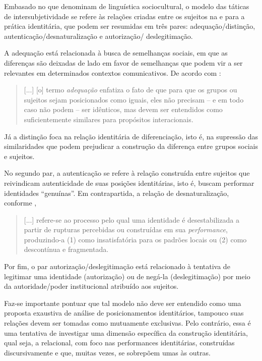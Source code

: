 \documentclass[portuguese]{textolivre}
\begin{document}
Embasado no que \textcite{bucholtz_language_2004,bucholtz_identity_2005} denominam de linguística sociocultural, o modelo das táticas de intersubjetividade se refere às relações criadas entre os sujeitos na e para a prática identitária, que podem ser resumidas em três pares: adequação/distinção, autenticação/desnaturalização e autorização/ deslegitimação.

A adequação está relacionada à busca de semelhanças sociais, em que as diferenças são deixadas de lado em favor de semelhanças que podem vir a ser relevantes em determinados contextos comunicativos. De acordo com \textcite[p. 599, grifo das autoras]{bucholtz_identity_2005}:

\begin{quote}
    [...] [o] termo \textit{adequação} enfatiza o fato de que para que os grupos ou sujeitos sejam posicionados como iguais, eles não precisam – e em todo caso não podem – ser idênticos, mas devem ser entendidos como suficientemente similares para propósitos interacionais.
\end{quote}

Já a distinção foca na relação identitária de diferenciação, isto é, na supressão das similaridades que podem prejudicar a construção da diferença entre grupos sociais e sujeitos.

No segundo par, a autenticação se refere à relação construída entre sujeitos que reivindicam autenticidade de suas posições identitárias, isto é, buscam performar identidades “genuínas”. Em contrapartida, a relação de desnaturalização, conforme \textcite[p. 451, grifo do autor]{borba_discurso_2009},

\begin{quote}
    [...] refere-se ao processo pelo qual uma identidade é desestabilizada a partir de rupturas percebidas ou construídas em sua \textit{performance}, produzindo-a (1) como insatisfatória para os padrões locais ou (2) como descontínua e fragmentada.
\end{quote}

Por fim, o par autorização/deslegitimação está relacionado à tentativa de legitimar uma identidade (autorização) ou de negá-la (deslegitimação) por meio da autoridade/poder institucional atribuído aos sujeitos.

Faz-se importante pontuar que tal modelo não deve ser entendido como uma proposta exaustiva de análise de posicionamentos identitários, tampouco suas relações devem ser tomadas como mutuamente exclusivas. Pelo contrário, essa é uma tentativa de investigar uma dimensão específica da construção identitária, qual seja, a relacional, com foco nas performances identitárias, construídas discursivamente e que, muitas vezes, se sobrepõem umas às outras.
\end{document}
